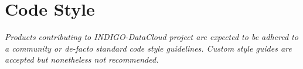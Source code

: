 \section{Code Style}
\footnotesize
\textit{Products contributing to INDIGO-DataCloud project are expected to be adhered to a community or de-facto standard code style guidelines. Custom style guides are accepted but nonetheless not recommended.}
\\[0.3in]
\normalsize
